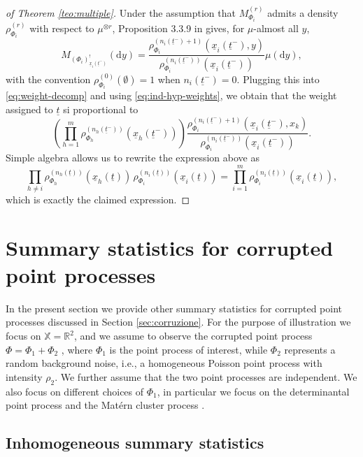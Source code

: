 \documentclass[11pt,a4paper,oneside]{article}
\newcommand{\dd}{\mathrm d}
\newcommand{\X}{\mathbb{X}}
\newcommand{\R}{\mathbb{R}}
\theoremstyle{definition}
\theoremstyle{remark}
\begin{document}
\begin{proof}[of Theorem \ref{teo:multiple}]
Under the assumption that $M_{\Phi_i}^{(r)}$ admits a density $\rho_{\Phi_i}^{(r)}$ with respect to $\mu^{\otimes r}$, Proposition 3.3.9 in \cite{BaBlaKa} gives, for $\mu$-almost all $y$,
\[
M_{(\Phi_i)^!_{\underline{x}_i(\underline{t}^-)}}(\dd y)
=\frac{\rho_{\Phi_i}^{(n_i(\underline{t}^-)+1)}\left(\underline{x}_i(\underline{t}^-),y\right)}{\rho_{\Phi_i}^{(n_i(\underline{t}^-))}\left(\underline{x}_i(\underline{t}^-)\right)}\mu(\dd y),
\]
with the convention $\rho_{\Phi_i}^{(0)}(\emptyset)=1$ when $n_i(\underline{t}^-)=0$.
Plugging this into \eqref{eq:weight-decomp} and using \eqref{eq:ind-hyp-weights}, we obtain that the weight assigned to $\underline{t}$ si proportional to
\[
\left(\prod_{h=1}^m \rho_{\Phi_h}^{(n_h(\underline{t}^-))}\left(\underline{x}_h(\underline{t}^-)\right)\right)
\frac{\rho_{\Phi_i}^{(n_i(\underline{t}^-)+1)}\left(\underline{x}_i(\underline{t}^-),x_k\right)}{\rho_{\Phi_i}^{(n_i(\underline{t}^-))}\left(\underline{x}_i(\underline{t}^-)\right)}.
\]
Simple algebra allows us to rewrite the expression above as
\[
\prod_{h\neq i} \rho_{\Phi_h}^{(n_h(\underline{t}))}\left(\underline{x}_h(\underline{t})\right)\,
\rho_{\Phi_i}^{(n_i(\underline{t}))}\left(\underline{x}_i(\underline{t})\right)
=
\prod_{i=1}^m \rho_{\Phi_i}^{(n_i(\underline{t}))}\left(\underline{x}_i(\underline{t})\right),
\]
which is exactly the claimed expression.
\end{proof}




\section{Summary statistics for corrupted point processes}

In the present section we provide other summary statistics for corrupted point processes discussed in Section \ref{sec:corruzione}. For the purpose of illustration we focus on $\X = \R^2$, and we assume to observe the corrupted point process $\Phi = \Phi_1+ \Phi_2$ , where $\Phi_1$ is the point process of interest, while $\Phi_2$ represents a random background noise, i.e., a homogeneous Poisson point process with intensity $\rho_2$. We further assume that the two point processes are independent. We also focus on different choices of $\Phi_1$, in particular we focus on  the determinantal point process \citep{Lavancier2015} and the Mat\'ern cluster process \citep{BaBlaKa}. \\


\subsection{Inhomogeneous summary statistics} \label{app:nonstat_summary}
\end{document}
